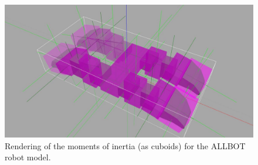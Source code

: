 \begin{figure}[htb]
    \centering
    \begin{minipage}{.9\textwidth}
        \centering
        \includegraphics[width=1\linewidth]{allbot_gazebo_shots/allbot_inertia_side_top.jpg}
        \caption{Rendering of the moments of inertia (as cuboids) for the ALLBOT robot model.}
        \label{fig:gaz_inertia}
    \end{minipage}
\end{figure}


